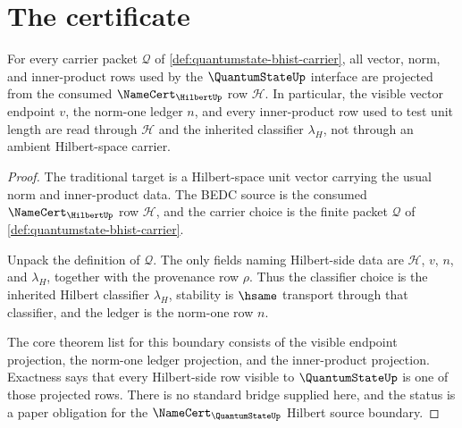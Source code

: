 \section{The certificate}
\label{sec:quantumstate-certificate}

\begin{theorem}
\label{thm:quantumstate-hilbert-source-boundary}
For every carrier packet $\mathcal{Q}$ of
\autoref{def:quantumstate-bhist-carrier}, all vector, norm, and inner-product
rows used by the $\QuantumStateUp$ interface are projected from the consumed
$\NameCert_{\HilbertUp}$ row $\mathcal{H}$. In particular, the visible vector
endpoint $v$, the norm-one ledger $n$, and every inner-product row used to test
unit length are read through $\mathcal{H}$ and the inherited classifier
$\lambda_H$, not through an ambient Hilbert-space carrier.
\end{theorem}
\begin{proof}
The traditional target is a Hilbert-space unit vector carrying the usual norm
and inner-product data. The BEDC source is the consumed
$\NameCert_{\HilbertUp}$ row $\mathcal{H}$, and the carrier choice is the finite
packet $\mathcal{Q}$ of \autoref{def:quantumstate-bhist-carrier}.

Unpack the definition of $\mathcal{Q}$. The only fields naming Hilbert-side
data are $\mathcal{H}$, $v$, $n$, and $\lambda_H$, together with the provenance
row $\rho$. Thus the classifier choice is the inherited Hilbert classifier
$\lambda_H$, stability is $\hsame$ transport through that classifier, and the
ledger is the norm-one row $n$.

The core theorem list for this boundary consists of the visible endpoint
projection, the norm-one ledger projection, and the inner-product projection.
Exactness says that every Hilbert-side row visible to $\QuantumStateUp$ is one
of those projected rows. There is no standard bridge supplied here, and the
status is a paper obligation for the $\NameCert_{\QuantumStateUp}$ Hilbert
source boundary.
\end{proof}

